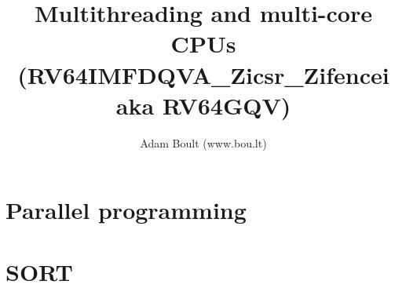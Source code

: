 \documentclass[oneside]{book}
\begin{document}
\author{Adam Boult (www.bou.lt)}
\title{Multithreading and multi-core CPUs (RV64IMFDQVA\_Zicsr\_Zifencei aka RV64GQV)}
\maketitle

\setcounter{tocdepth}{0}
\tableofcontents



\part{Parallel programming}


\part{SORT}

\end{document}
